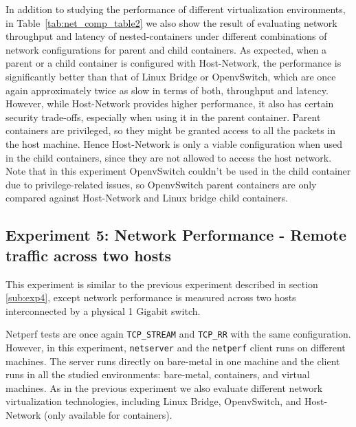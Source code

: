 \documentclass[conference]{IEEEtran}
\begin{document}
In addition to studying the performance of different virtualization
environments, in Table~\ref{tab:net_comp_table2} we also show the result of
evaluating network throughput and latency of nested-containers under different
combinations of network configurations for parent and child containers.  As
expected, when a parent or a child container is configured with Host-Network,
the performance is significantly better than that of Linux Bridge or
OpenvSwitch, which are once again approximately twice as slow in terms of
both, throughput and latency.  However, while Host-Network provides higher
performance, it also has certain security trade-offs, especially when using it
in the parent container. Parent containers are privileged, so they might be
granted access to all the packets in the host machine. Hence Host-Network is
only a viable configuration when used in the child containers, since they are
not allowed to access the host network.  Note that in this experiment
OpenvSwitch couldn't be used in the child container due to privilege-related
issues, so OpenvSwitch parent containers are only compared against
Host-Network and Linux bridge child containers.



\subsection{Experiment 5: Network Performance - Remote traffic across two hosts}
\label{sub:exp5}

This experiment is similar to the previous experiment described in section
\ref{sub:exp4}, except network performance is measured across two hosts
interconnected by a physical 1 Gigabit switch.

Netperf tests are once again \texttt{TCP\_STREAM} and \texttt{TCP\_RR} with
the same configuration.  However, in this experiment, \texttt{netserver} and
the \texttt{netperf} client runs on different machines. The server runs
directly on bare-metal in one machine and the client runs in all the studied
environments: bare-metal, containers, and virtual machines. As in the previous
experiment we also evaluate different network virtualization technologies,
including Linux Bridge, OpenvSwitch, and Host-Network (only
available for containers).
\end{document}
